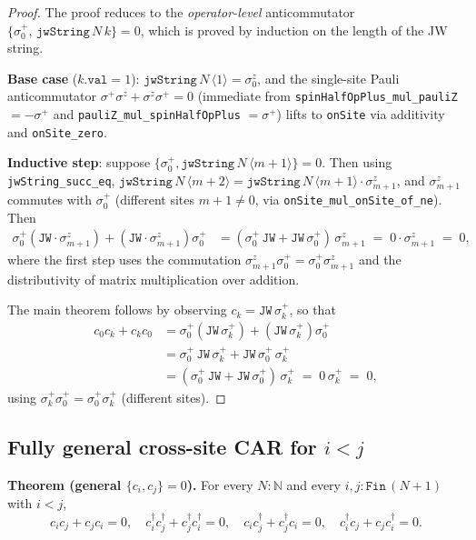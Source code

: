 \documentclass[a4paper,11pt]{article}
\begin{document}
\begin{proof}
The proof reduces to the \emph{operator-level} anticommutator
\(\{\sigma^+_0,\,\texttt{jwString}\,N\,k\} = 0\), which is proved
by induction on the length of the JW string.

\textbf{Base case} (\(k.\texttt{val} = 1\)):
\(\texttt{jwString}\,N\,\langle 1\rangle = \sigma^z_0\), and the
single-site Pauli anticommutator
\(\sigma^+\sigma^z + \sigma^z\sigma^+ = 0\) (immediate from
\texttt{spinHalfOpPlus\_mul\_pauliZ} \(= -\sigma^+\) and
\texttt{pauliZ\_mul\_spinHalfOpPlus} \(= \sigma^+\)) lifts to
\texttt{onSite} via additivity and \texttt{onSite\_zero}.

\textbf{Inductive step}: suppose
\(\{\sigma^+_0, \texttt{jwString}\,N\,\langle m+1\rangle\} = 0\).
Then using \texttt{jwString\_succ\_eq},
\(\texttt{jwString}\,N\,\langle m+2\rangle =
\texttt{jwString}\,N\,\langle m+1\rangle \cdot \sigma^z_{m+1}\), and
\(\sigma^z_{m+1}\) commutes with \(\sigma^+_0\) (different sites
\(m+1 \neq 0\), via \texttt{onSite\_mul\_onSite\_of\_ne}). Then
\begin{align*}
  \sigma^+_0 (\texttt{JW} \cdot \sigma^z_{m+1}) +
  (\texttt{JW} \cdot \sigma^z_{m+1})\sigma^+_0
  &= (\sigma^+_0\,\texttt{JW} + \texttt{JW}\,\sigma^+_0)\,\sigma^z_{m+1}
    \;=\; 0 \cdot \sigma^z_{m+1} \;=\; 0,
\end{align*}
where the first step uses the commutation
\(\sigma^z_{m+1}\sigma^+_0 = \sigma^+_0\sigma^z_{m+1}\) and the
distributivity of matrix multiplication over addition.

The main theorem follows by observing
\(c_k = \texttt{JW}\,\sigma^+_k\), so that
\begin{align*}
  c_0 c_k + c_k c_0
  &= \sigma^+_0 (\texttt{JW}\,\sigma^+_k) + (\texttt{JW}\,\sigma^+_k) \sigma^+_0 \\
  &= \sigma^+_0\,\texttt{JW}\,\sigma^+_k + \texttt{JW}\,\sigma^+_0\,\sigma^+_k \\
  &= (\sigma^+_0\,\texttt{JW} + \texttt{JW}\,\sigma^+_0)\,\sigma^+_k
    \;=\; 0\,\sigma^+_k \;=\; 0,
\end{align*}
using \(\sigma^+_k\sigma^+_0 = \sigma^+_0\sigma^+_k\) (different
sites).
\end{proof}

\subsection*{Fully general cross-site CAR for \(i < j\)}

\noindent\textbf{Theorem (general \(\{c_i, c_j\} = 0\)).} For every
\(N : \mathbb{N}\) and every \(i, j : \texttt{Fin}\,(N+1)\) with
\(i < j\),
\[
  c_i c_j + c_j c_i = 0,\quad
  c_i^\dagger c_j^\dagger + c_j^\dagger c_i^\dagger = 0,\quad
  c_i c_j^\dagger + c_j^\dagger c_i = 0,\quad
  c_i^\dagger c_j + c_j c_i^\dagger = 0.
\]
\end{document}
